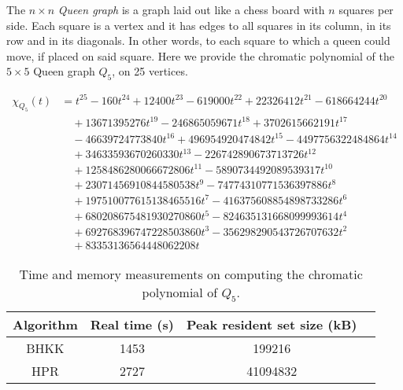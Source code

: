 \documentclass[a4paper]{article}
\begin{document}
The $n \times n$ \emph{Queen graph} is a graph laid out like a chess board with $n$ squares per side. Each square is a vertex and it has edges to all squares in its column, in its row and in its diagonals. In other words, to each square to which a queen could move, if placed on said square. Here we provide the chromatic polynomial of the $5 \times 5$ Queen graph $Q_5$, on 25 vertices.

\begin{equation*}
\begin{split}
\chi_{Q_5}(t) & = t^{25} -160t^{24} + 12400t^{23} -619000t^{22} + 22326412t^{21} -618664244t^{20} \\ & \quad 
+ 13671395276t^{19} -246865059671t^{18} + 3702615662191t^{17} \\ & \quad
-46639724773840t^{16} + 496954920474842t^{15}  -4497756322484864t^{14} \\ & \quad 
+ 34633593670260330t^{13} -226742890673713726t^{12} \\ & \quad 
+ 1258486280066672806t^{11} -5890734492089539317t^{10} \\ & \quad 
+ 23071456910844580538t^9 -74774310771536397886t^8 \\ & \quad  
+ 197510077615138465516t^7 -416375608854898733286t^6  \\ & \quad 
+ 680208675481930270860t^5 -824635131668099993614t^4 \\ & \quad 
+ 692768396747228503860t^3 -356298290543726707632t^2  \\ & \quad 
+ 83353136564448062208t
\end{split}
\end{equation*}

\begin{table}[H]\centering
\begin{tabular}{|c|c|c|c|} \hline
  Algorithm & Real time (s) & Peak resident set size (kB) \\ \hline
  BHKK & 1453 & 199216 \\ \hline
  HPR & 2727 & 41094832 \\ \hline
\end{tabular}
\caption{Time and memory measurements on computing the chromatic polynomial of $Q_5$.}
\end{table}




\end{document}
